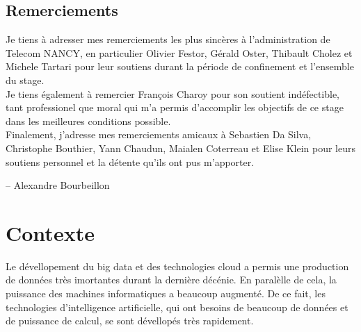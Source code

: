 \documentclass[stage3a]{tnreport} %
\begin{document}
\maketitle
{}


\cleardoublepage

\makesecondtitle

\section*{Remerciements}

{\em

Je tiens à adresser mes remerciements les plus sincères à l'administration de Telecom NANCY, en particulier Olivier Festor, Gérald Oster, Thibault Cholez et Michele Tartari pour leur soutiens durant la période de confinement et l'ensemble du stage. \\

Je tiens également à remercier François Charoy pour son soutient indéfectible, tant professionel que moral qui m'a permis d'accomplir les objectifs de ce stage dans les meilleures conditions possible.\\

Finalement, j'adresse mes remerciements amicaux à Sebastien Da Silva, Christophe Bouthier, Yann Chaudun, Maialen Coterreau et Elise Klein pour leurs soutiens personnel et la détente qu'ils ont pus m'apporter.

}

\hspace{4cm} -- Alexandre Bourbeillon


\cleardoublepage

\renewcommand{\baselinestretch}{0.5}\normalsize
\tableofcontents
\renewcommand{\baselinestretch}{1.0}\normalsize
\cleardoublepage

\setcounter{page}{1}

\chapter{Contexte}

Le dévellopement du big data et des technologies cloud a permis une production de données très imortantes durant la dernière décénie. En paralèlle de cela, la puissance des machines informatiques a beaucoup augmenté. De ce fait, les technologies d'intelligence artificielle, qui ont besoins de beaucoup de données et de puissance de calcul, se sont dévellopés très rapidement. 
\end{document}
